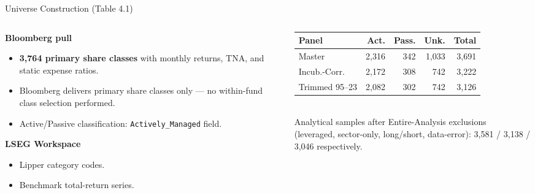 \documentclass[10pt, aspectratio=169]{beamer}
\begin{document}
\begin{frame}{Universe Construction (Table 4.1)}
  \begin{columns}[T]
    \begin{column}{0.54\textwidth}
      \textbf{Bloomberg pull}
      \begin{itemize}\itemsep3pt
        \item \textbf{3,764 primary share classes} with monthly returns, TNA, and static expense ratios.
        \item Bloomberg delivers primary share classes only — no within-fund class selection performed.
        \item Active/Passive classification: \texttt{Actively\_Managed} field.
      \end{itemize}
      \vspace{5pt}
      \textbf{LSEG Workspace}
      \begin{itemize}\itemsep3pt
        \item Lipper category codes.
        \item Benchmark total-return series.
      \end{itemize}
    \end{column}
    \begin{column}{0.44\textwidth}
      \footnotesize
      \begin{tabular}{lrrrr}
        \toprule
        Panel & Act. & Pass. & Unk. & Total \\
        \midrule
        Master           & 2,316 & 342 & 1,033 & 3,691 \\
        Incub.-Corr.     & 2,172 & 308 &   742 & 3,222 \\
        Trimmed 95–23    & 2,082 & 302 &   742 & 3,126 \\
        \bottomrule
      \end{tabular}
      \vspace{4pt}\\
      \tiny Analytical samples after Entire-Analysis exclusions\\
      (leveraged, sector-only, long/short, data-error):
      3,581 / 3,138 / 3,046 respectively.
    \end{column}
  \end{columns}
\end{frame}
\end{document}
